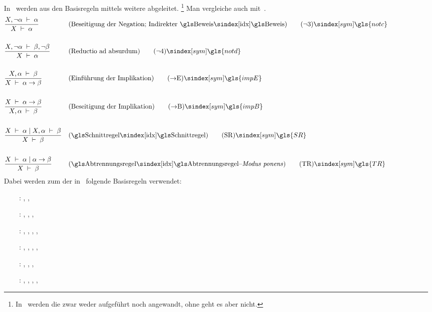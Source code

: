 {In~\cite{bib:Rautenberg} werden aus den Basisregeln mittels  weitere  abgeleitet.%
\footnote{%
	In~\cite{bib:Rautenberg} werden die  zwar weder aufgeführt noch angewandt, ohne  geht es aber nicht.
}
Man vergleiche auch mit~\cite{bib:NatuerlichesSchliessen}.
%
\begin{align}
	& \frac{X,\lnot\alpha\derive\alpha}{X\derive\alpha}
	& & (\text{Beseitigung der Negation; Indirekter \glsIdx{Beweis}})
	\tag{\tagnotc} \sym{\gls{notc}} \label{def:notc}
	\\\\
	& \frac{X,\lnot\alpha\derive\beta,\lnot\beta}{X\derive\alpha}
	& & (\text{Reductio ad absurdum})
	\tag{\tagnotd} \sym{\gls{notd}} \label{def:notd}
	\\\\
	& \frac{X,\alpha\derive\beta}{X\derive\alpha\limp\beta}
	& & (\text{Einführung der Implikation})
	\tag{\tagimpE} \sym{\gls{impE}} \label{def:impE}
	\\\\
	& \frac{X\derive\alpha\limp\beta}{X,\alpha\derive\beta}
	& & (\text{Beseitigung der Implikation})
	\tag{\tagimpB} \sym{\gls{impB}} \label{def:impB}
	\\\\
	& \frac{X\derive\alpha \srand X,\alpha\derive\beta}{X\derive\beta}
	& & (\text{\glsIdx{Schnittregel}})
	\tag{\tagSR} \sym{\gls{SR}} \label{def:SR}
	\\\\
	& \frac{X\derive\alpha \srand \alpha\limp\beta}{X\derive\beta}
	& & (\text{\glsIdx{Abtrennungsregel}--\emph{Modus ponens}})
	\tag{\tagTR} \sym{\gls{TR}} \label{def:TR}
	\formulatoleft
\end{align}
%
Dabei werden zum  der  in~\cite{bib:Rautenberg} folgende Basisregeln verwendet:
\begin{itemize}
	\renewcommand*{\itemindent}{1cm}
	\renewcommand*{\labelsep}{5pt}
	\item[\tagnotc~:] \tagAR, \tagMR,           \tagnotb
	\item[\tagnotd~:] \tagAR, \tagMR, \tagnota, \tagnotb
	\item[\tagimpE~:] \tagAR, \tagMR, \tagnota, \tagnotb, \tagandE
	\item[\tagimpB~:] \tagAR, \tagMR, \tagnota, \tagnotb          , \tagandB
	\item[\tagSR  ~:] \tagAR, \tagMR, \tagnota, \tagnotb
	\item[\tagTR  ~:] \tagAR, \tagMR, \tagnota, \tagnotb, \tagandE
\end{itemize}
%
}
